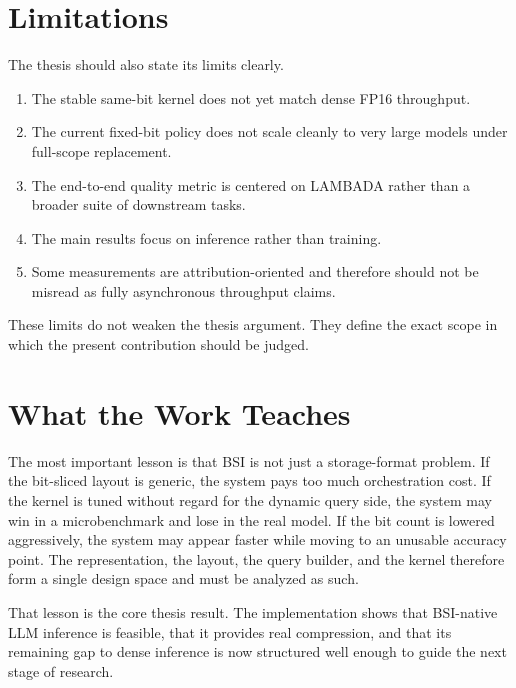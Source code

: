 \section{Limitations}
The thesis should also state its limits clearly.

\begin{enumerate}[leftmargin=2em]
\item The stable same-bit kernel does not yet match dense FP16 throughput.
\item The current fixed-bit policy does not scale cleanly to very large models under full-scope replacement.
\item The end-to-end quality metric is centered on LAMBADA rather than a broader suite of downstream tasks.
\item The main results focus on inference rather than training.
\item Some measurements are attribution-oriented and therefore should not be misread as fully asynchronous throughput claims.
\end{enumerate}

These limits do not weaken the thesis argument. They define the exact scope in which the present contribution should be judged.

\section{What the Work Teaches}
The most important lesson is that BSI is not just a storage-format problem. If the bit-sliced layout is generic, the system pays too much orchestration cost. If the kernel is tuned without regard for the dynamic query side, the system may win in a microbenchmark and lose in the real model. If the bit count is lowered aggressively, the system may appear faster while moving to an unusable accuracy point. The representation, the layout, the query builder, and the kernel therefore form a single design space and must be analyzed as such.

That lesson is the core thesis result. The implementation shows that BSI-native LLM inference is feasible, that it provides real compression, and that its remaining gap to dense inference is now structured well enough to guide the next stage of research.
